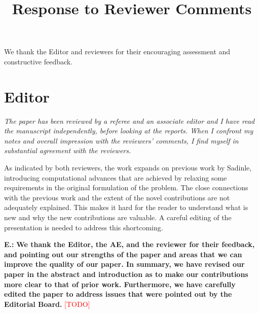 \documentclass[letterpaper, parskip]{scrartcl}
\newcommand{\pointRaised}[1]{%
	\begin{tcolorbox}
		\itshape #1
	\end{tcolorbox}
}
\newcounter{responsectr}[section]     %
\newcommand{\reply}[2]{%
	\refstepcounter{responsectr}%
	\textbf{#1.\theresponsectr:} #2
}
\newcommand{\todo}{\textcolor{red}{[TODO]}\xspace}
\begin{document}
	
	
	\title{Response to Reviewer Comments}
	
	\maketitle
	We thank the Editor and reviewers for their encouraging assessment and constructive 
	feedback.
	
	
	\section*{Editor}
	
	
	\pointRaised{%
	The paper has been reviewed by a referee and an associate editor and I have read the manuscript independently, before looking at the reports.  When I confront my notes and overall impression with the reviewers’ comments, I find myself in substantial agreement with the reviewers.
	
	As indicated by both reviewers, the work expands on previous work by Sadinle, introducing computational advances that are achieved by relaxing some requirements in the original formulation of the problem.  The close connections with the previous work and the extent of the novel contributions are not adequately explained.  This makes it hard for the reader to understand what is new and why the new contributions are valuable.  A careful editing of the presentation is needed to address this shortcoming.}
	
			\reply{E}{%
	\textbf{We thank the Editor, the AE, and the reviewer for their feedback, and pointing out our strengths of the paper and areas that we can improve the quality of our paper. In summary, we have revised our paper in the abstract and introduction as to make our contributions more clear to that of prior work.  Furthermore, we have carefully edited the paper to address issues that were pointed out by the Editorial Board.} \todo
	}
	
	\newpage
\end{document}
